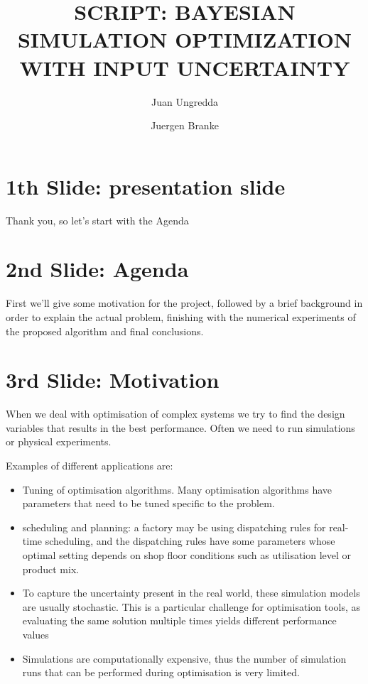 \documentclass[10pt]{article}
\title{SCRIPT: BAYESIAN SIMULATION OPTIMIZATION WITH INPUT UNCERTAINTY}
\author{
	Juan Ungredda
	\and
	Juergen Branke\\
}
\begin{document}
\maketitle 

\section{1th Slide: presentation slide}

Thank you, so let's start with the Agenda

\section{2nd Slide: Agenda}

First we'll give some motivation for the project, followed by a brief background in order to explain the actual problem, finishing with the numerical experiments of the proposed algorithm and final conclusions.



\section{3rd Slide: Motivation}

When we deal with optimisation of complex systems we try to find the design variables that results in the best performance. Often we need to run simulations or physical experiments. 


Examples of different applications are:
\begin{itemize}
	\item  Tuning of optimisation algorithms. Many optimisation algorithms
	have parameters that need to be tuned specific to the problem.
	\item scheduling and planning: a factory may be using
	dispatching rules for real-time scheduling, and the dispatching
	rules have some parameters whose optimal setting depends on
	shop floor conditions such as utilisation level or product mix.
	
\end{itemize}

\begin{itemize}
	\item  To capture the uncertainty present in the real world, these simulation models are usually
	stochastic. This is a particular challenge for optimisation tools, as evaluating the same
	solution multiple times yields different performance values
	\item Simulations
	are computationally expensive, thus the number of simulation runs that can be performed
	during optimisation is very limited.
\end{itemize}
 
\end{document}
